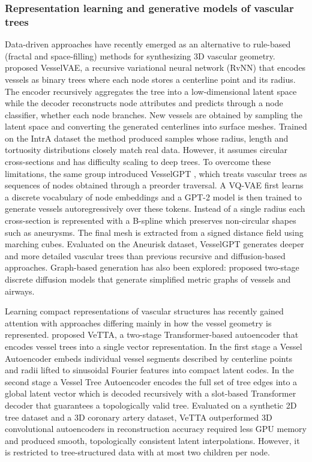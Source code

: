 \subsubsection{Representation learning and generative models of vascular trees}  %
\label{sec:related_representation}       %

Data-driven approaches have recently emerged as an alternative to rule-based (fractal and
space-filling) methods for synthesizing 3D vascular geometry. \citet{feldman2023vesselvae}
proposed VesselVAE, a recursive variational neural network (RvNN) that encodes vessels as
binary trees where each node stores a centerline point and its radius. The encoder
recursively aggregates the tree into a low-dimensional latent space while the decoder
reconstructs node attributes and predicts through a node classifier, whether each node
branches. New vessels are obtained by sampling the latent space and converting the generated
centerlines into surface meshes. Trained on the IntrA dataset the method produced samples
whose radius, length and tortuosity distributions closely match real data. However, it
assumes circular cross-sections and has difficulty scaling to deep trees. To overcome these
limitations, the same group introduced VesselGPT \cite{feldman2025vesselgpt}, which treats
vascular trees as sequences of nodes obtained through a preorder traversal. A VQ-VAE first
learns a discrete vocabulary of node embeddings and a GPT-2 model is then trained to generate
vessels autoregressively over these tokens. Instead of a single radius each cross-section is
represented with a B-spline which preserves non-circular shapes such as aneurysms. The final
mesh is extracted from a signed distance field using marching cubes. Evaluated on the
Aneurisk dataset, VesselGPT generates deeper and more detailed vascular trees than previous
recursive and diffusion-based approaches. Graph-based generation has also been explored:
\citet{prabhakar2024vesselgraph,prabhakar2025semantic} proposed two-stage discrete diffusion
models that generate simplified metric graphs of vessels and airways.

Learning compact representations of vascular structures has recently gained attention with
approaches differing mainly in how the vessel geometry is represented.
\citet{batten2025vetta} proposed VeTTA, a two-stage Transformer-based autoencoder that encodes
vessel trees into a single vector representation. In the first stage a Vessel Autoencoder
embeds individual vessel segments described by centerline points and radii lifted to
sinusoidal Fourier features into compact latent codes. In the second stage a Vessel Tree
Autoencoder encodes the full set of tree edges into a global latent vector which is decoded
recursively with a slot-based Transformer decoder that guarantees a topologically valid tree.
Evaluated on a synthetic 2D tree dataset and a 3D coronary artery dataset, VeTTA outperformed
3D convolutional autoencoders in reconstruction accuracy required less GPU memory and
produced smooth, topologically consistent latent interpolations. However, it is restricted to
tree-structured data with at most two children per node.

